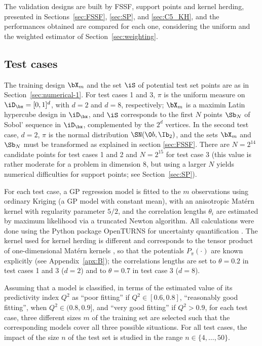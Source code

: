 The validation designs are built by FSSF, support points and kernel herding, presented in Sections~\ref{sec:FSSF}, \ref{sec:SP}, and \ref{sec:C5_KH}, 
and the performances obtained are compared for each one, considering the uniform and the weighted estimator of Section~\ref{sec:weighting}. 

\subsection{Test cases} \label{sec:testCases}

The training design $\bX_m$ and the set $\iS$ of potential test set points are as in Section~\ref{sec:numerical-1}. 
For test cases 1 and 3, $\pi$ is the uniform measure on $\iD_\bx=[0,1]^d$, with $d=2$ and $d=8$, respectively; $\bX_m$ is a maximin Latin hypercube design in $\iD_\bx$, and $\iS$ corresponds to the first $N$ points $\Sb_N$ of Sobol' sequence in $\iD_\bx$, complemented by the $2^d$ vertices. 
In the second test case, $d=2$, $\pi$ is the normal distribution $\SN(\0b,\Ib_2)$, and the sets $\bX_m$ and $\Sb_N$ must be transformed as explained in section \ref{sec:FSSF}. 
There are $N=2^{14}$ candidate points for test cases 1 and 2 and $N=2^{15}$ for test case 3 (this value is rather moderate for a problem in dimension 8, but using a larger $N$ yields numerical difficulties for support points; see Section~\ref{sec:SP}). 

For each test case, a GP regression model is fitted to the $m$ observations using ordinary Kriging \citep{rasmussen_2006} (a GP model with constant mean), with an anisotropic Matérn kernel with regularity parameter $5/2$, and the correlation lengths $\theta_i$ are estimated by maximum likelihood via a truncated Newton algorithm. 
All calculations were done using the Python package OpenTURNS for uncertainty quantification \citep{baudin_dutfoy_2017}. 
The kernel used for kernel herding is different and corresponds to the tensor product of one-dimensional Matérn kernels , so that the potentials $P_{\pi}(\cdot)$ are known explicitly (see Appendix~\ref{apx:B}); the correlations lengths are set to $\theta=0.2$ in test cases 1 and 3 ($d=2$) and to $\theta=0.7$ in test case 3 ($d=8$).

Assuming that a model is classified, in terms of the estimated value of its predictivity index $Q^2$ as ``poor fitting'' if $Q^2\in[0.6, 0.8]$, ``reasonably good fitting'', when $Q^2\in(0.8,0.9]$, and ``very good fitting'' if $Q^2>0.9$, for each test case, three different sizes $m$ of the training set are selected such that the corresponding models cover all three possible situations. 
For all test cases, the impact of the size $n$ of the test set is studied in the range $n\in\{4,\ldots,50\}$.

